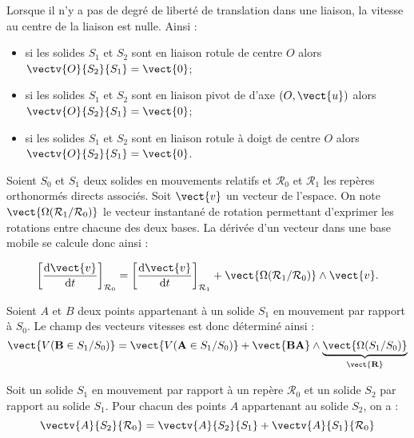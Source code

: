 %


\begin{resultat}
Lorsque il n'y a pas de degré de liberté de translation dans une liaison, la vitesse au centre de la liaison est nulle. Ainsi : 
\begin{itemize}
\item si les solides $S_1$ et $S_2$ sont en liaison rotule de centre $O$ alors $\vectv{O}{S_2}{S_1}=\vect{0}$;
\item si les solides $S_1$ et $S_2$ sont en liaison pivot de d'axe $\left(O,\vect{u}\right)$ alors $\vectv{O}{S_2}{S_1}=\vect{0}$;
\item si les solides $S_1$ et $S_2$ sont en liaison rotule à doigt de centre $O$ alors $\vectv{O}{S_2}{S_1}=\vect{0}$.
\end{itemize}
\end{resultat}


\begin{resultat}

Soient $S_0$ et $S_1$ deux solides en mouvements relatifs et $\mathcal{R}_0$ et $\mathcal{R}_1$ les repères orthonormés directs associés. Soit $\vect{v}$ un vecteur de l'espace. On note $\vect{\Omega(\mathcal{R}_1/\mathcal{R}_0)}$ le vecteur instantané de rotation permettant d'exprimer les rotations entre chacune des deux bases. La dérivée d'un vecteur dans une base mobile se calcule donc ainsi :

$$
\left[\dfrac{\text{d}\vect{v}}{\text{d}t}\right]_{\mathcal{R}_0} =
\left[\dfrac{\text{d}\vect{v}}{\text{d}t}\right]_{\mathcal{R}_1} 
+ \vect{\Omega(\mathcal{R}_1/\mathcal{R}_0)}\wedge \vect{v}.
$$
\end{resultat}


\begin{resultat}

Soient $A$ et $B$ deux points appartenant à un solide $S_1$ en mouvement par rapport à $S_0$. Le champ des vecteurs vitesses est donc déterminé ainsi :
$$
\vect{V(\mathbf{B}\in S_1/S_0)} = \vect{V(\mathbf{A}\in S_1/S_0)} + \vect{\mathbf{BA}}\wedge \underbrace{\vect{\Omega(S_1/S_0)}}_{\mathbf{\vect{R}}}
$$

\end{resultat}


\begin{resultat}
\label{ref_va}

Soit un solide $S_1$ en mouvement par rapport à un repère $\mathcal{R}_0$ et un solide $S_2$ par rapport au solide $S_1$. Pour chacun des points $A$ appartenant au solide $S_2$, on a :
$$
\vectv{A}{S_2}{\mathcal{R}_0}=
\vectv{A}{S_2}{S_1}+\vectv{A}{S_1}{\mathcal{R}_0}
$$
\end{resultat}


